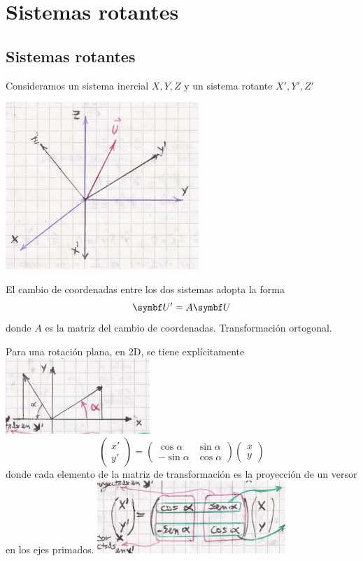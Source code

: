 \documentclass[10pt,oneside]{CBFT_book}
\begin{document}
\chapter{Sistemas rotantes}

\section{Sistemas rotantes}

Consideramos un sistema inercial $X,Y,Z$ y un sistema rotante $X',Y',Z'$

\includegraphics[scale=0.5]{images/fig_mc_rotantes1.jpg}

El cambio de coordenadas entre los dos sistemas adopta la forma 
\[
	\vb{U}' = A \vb{U}
\]
donde $A$ es la matriz del cambio de coordenadas. Transformación ortogonal.

Para una rotación plana, en 2D, se tiene explícitamente
\includegraphics[scale=0.5]{images/fig_mc_rotantes2.jpg}
\[
	\begin{pmatrix}
	x' \\
	y'
	\end{pmatrix} =
	\begin{pmatrix}
	 \cos \alpha & \sin \alpha \\
	 -\sin \alpha & \cos \alpha 
	\end{pmatrix} 
	\begin{pmatrix}
	 x \\
	 y
	\end{pmatrix} 
\]
donde cada elemento de la matriz de transformación es la proyección de un versor en los ejes
primados.
\includegraphics[scale=0.5]{images/fig_mc_rotantes3.jpg}
\end{document}

